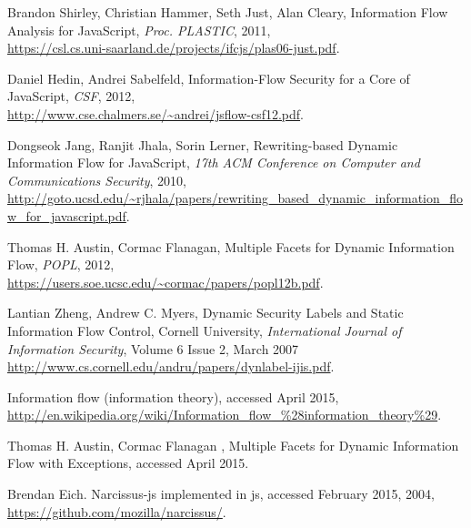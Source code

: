 %
%
%
%
\begin{thebibliography}{10}

 Brandon Shirley, Christian Hammer, Seth Just, Alan Cleary, Information Flow Analysis for JavaScript, {\it Proc. PLASTIC}, 2011,\\
\url{https://csl.cs.uni-saarland.de/projects/ifcjs/plas06-just.pdf}.

 Daniel Hedin, Andrei Sabelfeld, Information-Flow Security for a Core of JavaScript, {\it CSF}, 2012, \\
\url{http://www.cse.chalmers.se/~andrei/jsflow-csf12.pdf}.

 Dongseok Jang, Ranjit Jhala, Sorin Lerner, Rewriting-based Dynamic Information Flow for JavaScript, { \it 17th ACM Conference on Computer and Communications Security}, 2010, \\
\url{http://goto.ucsd.edu/~rjhala/papers/rewriting_based_dynamic_information_flow_for_javascript.pdf}.

 Thomas H. Austin, Cormac Flanagan, Multiple Facets for Dynamic Information Flow, {\it POPL}, 2012,\\
\url{https://users.soe.ucsc.edu/~cormac/papers/popl12b.pdf}.

 Lantian Zheng, Andrew C. Myers, Dynamic Security Labels and Static Information Flow Control, Cornell University, {\it International Journal of Information Security}, Volume 6 Issue 2, March 2007 \\
\url{http://www.cs.cornell.edu/andru/papers/dynlabel-ijis.pdf}.

 Information flow (information theory), accessed April 2015, \\
\url{http://en.wikipedia.org/wiki/Information_flow_%28information_theory%29}.

 Thomas H. Austin, Cormac Flanagan , Multiple Facets for Dynamic Information Flow with Exceptions, accessed April 2015.

 Brendan Eich. Narcissus-js implemented in js, accessed February 2015, 2004,\\  \url{https://github.com/mozilla/narcissus/}.


\end{thebibliography}
